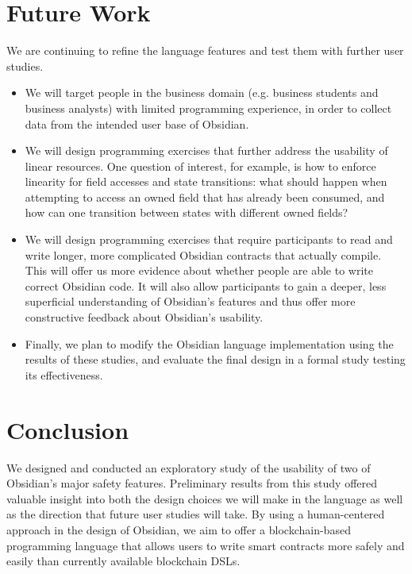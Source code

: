 \documentclass[sigplan,10pt,review]{acmart}\settopmatter{printfolios=true}
\begin{document}
\section{Future Work}

We are continuing to refine the language features and test them with further user studies.
\begin{itemize}
\item We will target people in the business domain (e.g. business students and business analysts) with limited
programming experience, in order to collect data from the intended user base of Obsidian.
\item We will design programming exercises that further address the usability of linear resources. One question
of interest, for example, is how to enforce linearity for field accesses and state transitions: what should happen
when attempting to access an owned field that has already been consumed, and how can one transition
between states with different owned fields? 
\item We will design programming exercises that require participants to read and write longer, more complicated 
Obsidian contracts that actually compile. This will offer us more evidence about whether people are able to write 
correct Obsidian code. It will also allow participants to gain a deeper, less superficial understanding of Obsidian's 
features and thus offer more constructive feedback about Obsidian's usability. 
\item Finally, we plan to modify the Obsidian language implementation using the results of these studies, 
and evaluate the final design in a formal study testing its effectiveness.
\end{itemize}

\section{Conclusion}

We designed and conducted an exploratory study of the usability of two of Obsidian's major safety features. 
Preliminary results from this study offered valuable insight into both the design choices we will make in the 
language as well as the direction that future user studies will take. By using a human-centered approach in the 
design of Obsidian, we aim to offer a blockchain-based programming language that allows users to write smart 
contracts more safely and easily than currently available blockchain DSLs.


\end{document}
